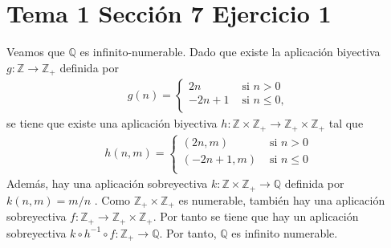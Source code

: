 \documentclass{article}
\begin{document}
\section{Tema 1 Sección 7 Ejercicio 1}
Veamos que $\mathbb{Q}$ es infinito-numerable. Dado que existe la aplicación biyectiva $g: \mathbb{Z}\rightarrow \mathbb{Z}_{+}$ definida por 
\begin{eqnarray}
g(n)=\begin{cases}
2n & \text{ si } n>0 \nonumber\\
-2n+1 & \text{ si } n\leq 0, \nonumber\\
\end{cases}
\end{eqnarray}
se tiene que existe una aplicación biyectiva $h: \mathbb{Z}\times\mathbb{Z}_{+}\rightarrow \mathbb{Z}_{+}\times\mathbb{Z}_{+} $ tal que
\begin{eqnarray}
h(n,m)=\begin{cases}
(2n,m) & \text{ si } n>0 \nonumber\\
(-2n+1,m) & \text{ si } n\leq 0 \nonumber\\
\end{cases}
\end{eqnarray}
Además, hay una aplicación sobreyectiva
$k:\mathbb{Z}\times\mathbb{Z}_{+}\rightarrow \mathbb{Q}$
definida por $k(n,m)=m/n$
. Como $\mathbb{Z}_{+}\times\mathbb{Z}_{+}$ es numerable, también hay una aplicación sobreyectiva $f:\mathbb{Z}_{+}\rightarrow \mathbb{Z}_{+} \times \mathbb{Z}_{+}$. Por tanto se tiene que hay un aplicación sobreyectiva $ k\circ h^{-1} \circ f:\mathbb{Z}_{+}\rightarrow \mathbb{Q}$. Por tanto, $\mathbb{Q}$ es infinito numerable.
\end{document}
